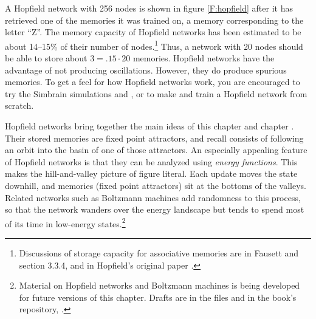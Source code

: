 A Hopfield network with 256 nodes is shown in figure \ref{F:hopfield} after it has retrieved one of the memories it was trained on, a memory corresponding to the letter ``Z''. The memory capacity of Hopfield networks has been estimated to be about 14--15\% of their number of nodes.\footnote{Discussions of storage capacity for associative memories are in Fausett \cite[p.~140]{fausett1994fundamentals} and section 3.3.4, and in Hopfield's original paper \cite[p.~2556]{hopfield1982neural}.}  Thus, a network with 20 nodes should be able to store about $3 = .15 \cdot 20$ memories. Hopfield networks have the advantage of not producing oscillations. However, they do produce spurious memories. To get a feel for how Hopfield networks work, you are encouraged to try the Simbrain simulations  and , or to make and train a Hopfield network from scratch. 

Hopfield networks bring together the main ideas of this chapter and chapter . Their stored memories are fixed point attractors, and recall consists of following an orbit into the basin of one of those attractors. An especially appealing feature of Hopfield networks is that they can be analyzed using \emph{energy functions}. This makes the hill-and-valley picture of figure  literal. Each update moves the state downhill, and memories (fixed point attractors) sit at the bottoms of the valleys. Related networks such as Boltzmann machines add randomness to this process, so that the network wanders over the energy landscape but tends to spend most of its time in low-energy states.\footnote{Material on Hopfield networks and Boltzmann machines is being developed for future versions of this chapter. Drafts are in the files  and  in the book's repository, .}
